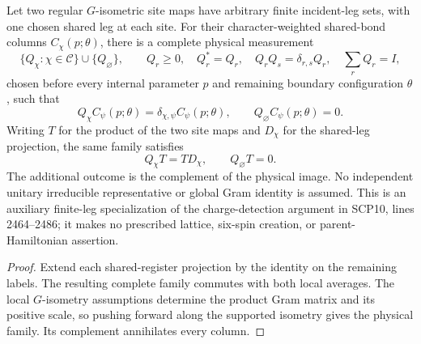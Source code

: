\begin{lemma}
    \label{thm:peps_regular_two_site_all_charge_measurement}
    Let two regular $G$-isometric site maps have arbitrary finite incident-leg sets,
    with one chosen shared leg at each site. For their character-weighted
    shared-bond columns $C_\chi(p;\theta)$, there is a complete physical measurement
    \[
        \{Q_\chi:\chi\in\mathcal C\}\cup\{Q_\varnothing\},
        \qquad Q_r\geq0,\quad Q_r^*=Q_r,\quad
        Q_rQ_s=\delta_{r,s}Q_r,\quad \sum_rQ_r=I,
    \]
    chosen before every internal parameter $p$ and remaining boundary configuration
    $\theta$, such that
    \[
        Q_\chi C_\psi(p;\theta)=\delta_{\chi,\psi}C_\psi(p;\theta),
        \qquad Q_\varnothing C_\psi(p;\theta)=0.
    \]
    Writing $T$ for the product of the two site maps and $D_\chi$ for the
    shared-leg projection, the same family satisfies
    \[ Q_\chi T=T D_\chi,\qquad Q_\varnothing T=0. \]
    The additional outcome is the complement of the physical image. No independent
    unitary irreducible representative or global Gram identity is assumed.
    This is an auxiliary finite-leg specialization of the charge-detection argument
    in SCP10, lines 2464--2486; it makes no prescribed lattice, six-spin creation,
    or parent-Hamiltonian assertion.
    \leanok
\end{lemma}
\begin{proof}
    \leanok
    Extend each shared-register projection by the identity on the remaining labels.
    The resulting complete family commutes with both local averages. The
    local $G$-isometry assumptions determine the product Gram matrix and its positive
    scale, so pushing forward along the supported isometry gives the physical family. Its complement
    annihilates every column.
\end{proof}
